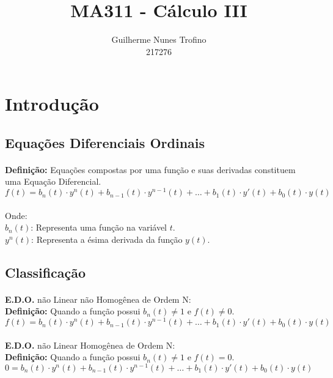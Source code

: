 \documentclass{article}
\title{MA311 - Cálculo III}
\author{Guilherme Nunes Trofino\\217276}
\begin{document}
    \maketitle
\newpage

    \tableofcontents
\newpage

\section{Introdução}
    \subsection{Equações Diferenciais Ordinais}
        \paragraph{}\textbf{Definição:} Equações compostas por uma função e suas derivadas constituem uma Equação Diferencial.
            \[f(t) = b_{n}(t) \cdot y^{n}(t) + b_{n-1}(t) \cdot y^{n-1}(t) + \dots +b_{1}(t) \cdot y'(t) + b_{0}(t) \cdot y(t)\]
        \paragraph{}Onde:\\
            \quad$b_{n}(t)$: Representa uma função na variável $t$.\\
            \quad$y^{n}(t)$: Representa a ésima derivada da função $y(t)$.
   
   \subsection{Classificação}
        \paragraph{}\textbf{E.D.O.} não Linear não Homogênea de Ordem N:\\
        \textbf{Definição:} Quando a função possui $b_{n}(t) \neq 1$ e $f(t) \neq 0$.
            \[f(t) = b_{n}(t) \cdot y^{n}(t) + b_{n-1}(t) \cdot y^{n-1}(t) + \dots +b_{1}(t) \cdot y'(t) + b_{0}(t) \cdot y(t)\]
        
        \paragraph{}\textbf{E.D.O.} não Linear Homogênea de Ordem N:\\
        \textbf{Definição:} Quando a função possui $b_{n}(t) \neq 1$ e $f(t) = 0$.
            \[0 = b_{n}(t) \cdot y^{n}(t) + b_{n-1}(t) \cdot y^{n-1}(t) + \dots +b_{1}(t) \cdot y'(t) + b_{0}(t) \cdot y(t)\]
        
\end{document}
